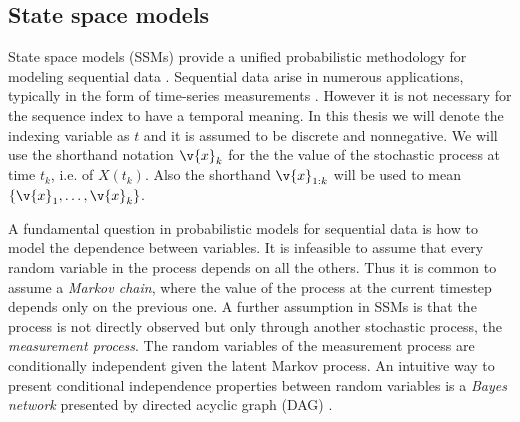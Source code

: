 \subsection{State space models}

State space models (SSMs) provide a unified probabilistic methodology for modeling
sequential data \parencite{ljung1994modeling,durbin2012time,Cappe2005,barber2011bayesian}. Sequential data arise in numerous applications, typically in the form
of time-series measurements . However it is not necessary for the sequence index to have
a temporal meaning. In this thesis we will denote the indexing variable as $t$ and it
is assumed to be discrete and nonnegative. We will use the shorthand notation $\v{x}_k$ for the 
the value of the stochastic process at time $t_k$, i.e. of $X(t_k)$. Also the shorthand $\v{x}_{1:k}$
will be used to mean $\{\v{x}_1,\dots,\v{x}_k\}$.

A fundamental question in probabilistic models for sequential data is how 
to model the dependence between variables. It is infeasible to assume
that every random variable in the process depends on all the others.
Thus it is common to assume a \emph{Markov chain}, where the value of
the process at the current timestep depends only on the previous one.
A further assumption in SSMs is that the process is not directly observed
but only through another stochastic process, the \emph{measurement process}.
The random variables of the measurement process are conditionally independent
given the latent Markov process.
An intuitive way to present conditional independence properties between random
variables is a \emph{Bayes network} presented by directed acyclic graph (DAG) \parencite{pearl1988probabilistic,Bishop2006}.

